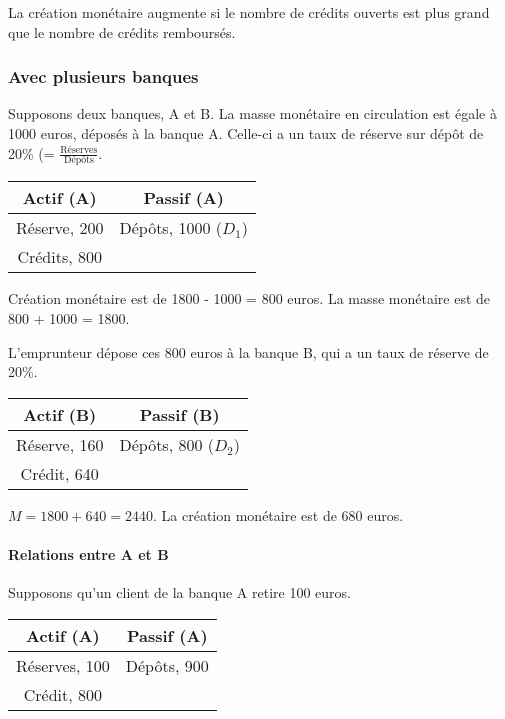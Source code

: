	La création monétaire augmente si le nombre de crédits ouverts est plus grand que le nombre de crédits remboursés.
	
	
	\subsubsection{Avec plusieurs banques}
	
	Supposons deux banques, A et B. La masse monétaire en circulation est égale à 1000 euros, déposés à la banque A. Celle-ci a un taux de réserve sur dépôt de 20\% (= $\frac{\text{Réserves}}{\text{Dépôts}}$.
	
\begin{center}
	\begin{tabular}{c|c}
	Actif (A) & Passif (A)\\ 
	\hline 
	Réserve, 200 & Dépôts, 1000 ($D_1$) \\ 
	Crédits, 800 &  
	\end{tabular} 
\end{center}
	
	Création monétaire est de 1800 - 1000 = 800 euros. La masse monétaire est de 800 + 1000 = 1800.
	
	L'emprunteur dépose ces 800 euros à la banque B, qui a un taux de réserve de 20\%.
	
\begin{center}
	\begin{tabular}{c|c}
	Actif (B) & Passif (B) \\ 
	\hline 
	Réserve, 160 & Dépôts, 800 ($D_2$) \\ 
	Crédit, 640 &  
	\end{tabular} 
\end{center}
	
	$M = 1800 + 640 = 2440$. La création monétaire est de 680 euros.
	
	\paragraph{Relations entre A et B}
	
	Supposons qu'un client de la banque A retire 100 euros.
	
\begin{center}
	\begin{tabular}{c|c}
	Actif (A) & Passif (A) \\ 
	\hline 
	Réserves, 100 & Dépôts, 900 \\ 
	Crédit, 800 &  
	\end{tabular} 
\end{center}
	
